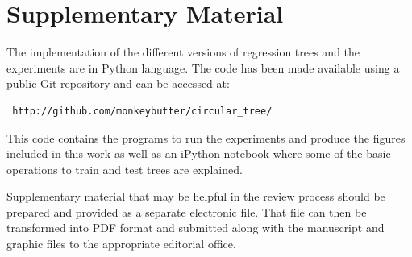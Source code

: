 \documentclass[times,twocolumn,final,authoryear]{elsarticle}
\begin{document}




\section*{Supplementary Material}

The implementation of the different versions of regression trees and the experiments are in Python language. The code has been made available using a public Git repository and can be accessed at:

\begin{verbatim}
 http://github.com/monkeybutter/circular_tree/
\end{verbatim}

This code contains the programs to run the experiments and produce the figures included in this work as well as an iPython notebook where some of the basic operations to train and test trees are explained.

Supplementary material that may be helpful in the review process should be prepared and provided as a separate electronic file. That file can then be transformed into PDF format and submitted along with the manuscript and graphic files to the appropriate editorial office.
\end{document}
